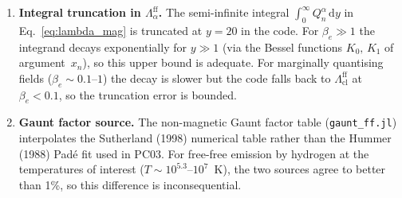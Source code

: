 \begin{enumerate}
\item \textbf{Integral truncation in $\Lambda_\alpha^{\mathrm{ff}}$.}
  The semi-infinite integral $\int_0^\infty Q_n^\alpha\,\mathrm{d}y$ in
  Eq.~\eqref{eq:lambda_mag} is truncated at $y=20$ in the code.
  For $\beta_e \gg 1$ the integrand decays exponentially for $y \gg 1$
  (via the Bessel functions $K_0,\,K_1$ of argument~$x_n$), so this
  upper bound is adequate.  For marginally quantising fields
  ($\beta_e \sim 0.1$--$1$) the decay is slower but the code falls back
  to $\Lambda_{\mathrm{cl}}^{\mathrm{ff}}$ at $\beta_e < 0.1$, so the
  truncation error is bounded.

\item \textbf{Gaunt factor source.}
  The non-magnetic Gaunt factor table
  (\texttt{gaunt\_ff.jl}) interpolates the Sutherland (1998) numerical
  table rather than the Hummer (1988) Pad\'e fit used in PC03.
  For free-free emission by hydrogen at the temperatures of interest
  ($T \sim 10^{5.3}$--$10^{7}$~K), the two sources agree to better
  than 1\%, so this difference is inconsequential.

\end{enumerate}
